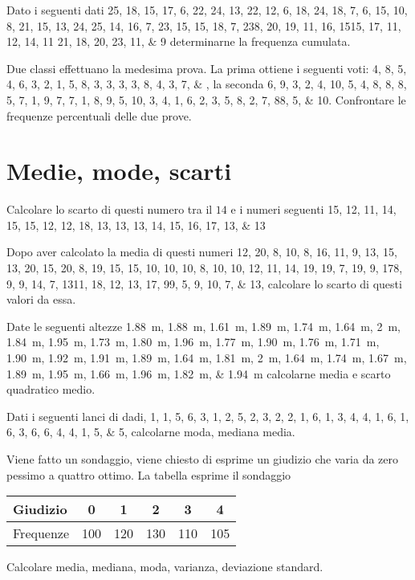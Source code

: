 \begin{esercizio}
Dato i seguenti dati \numlist{25; 18; 15; 17; 6; 22; 24; 13; 22; 12; 6; 18; 24; 18; 7; 6; 15; 10; 8; 21; 15; 13;
	24; 25; 14; 16; 7; 23; 15; 15; 18; 7; 23 8; 20; 19; 11; 16; 15 15; 17; 11; 12; 14; 11
	21; 18; 20; 23; 11; 9} determinarne la frequenza cumulata.
\end{esercizio}
\begin{esercizio}
	Due classi effettuano la medesima prova. La prima ottiene i seguenti voti: \numlist{4; 8; 5; 4; 6; 3; 2; 1; 5; 8; 3; 3; 3; 3; 8; 4; 3; 7;}, la seconda \numlist{6; 9; 3; 2; 4; 10; 5; 4; 8; 8; 8; 5; 7; 1; 9; 7; 7; 1; 8; 9; 5; 10; 3; 4; 1; 6; 2; 3; 5;
		8; 2; 7; 8 8; 5; 10}. Confrontare le frequenze percentuali delle due prove.
\end{esercizio} 
\section{Medie, mode, scarti}
\begin{esercizio}
	Calcolare lo scarto di questi numero tra il $14$ e i numeri seguenti \numlist{15; 12; 11; 14; 15; 15; 12; 12; 18; 13; 13; 13; 14; 15; 16; 17; 13; 13}
\end{esercizio}
\begin{esercizio}
	Dopo aver calcolato la media di questi numeri \numlist{12; 20; 8; 10; 8; 16; 11; 9; 13; 15; 13; 20; 15; 20; 8; 19; 15; 15; 10; 10; 10; 8;
		10; 10; 12; 11; 14; 19; 19; 7; 19; 9; 17 8; 9; 9; 14; 7; 13 11; 18; 12; 13; 17; 9 9; 5;
		9; 10; 7; 13}, calcolare lo scarto di questi valori da essa.
\end{esercizio}
\begin{esercizio}
	 Date le seguenti altezze \SIlist{1.88; 1.88; 1.61; 1.89; 1.74; 1.64; 2; 1.84; 1.95; 1.73; 1.80; 1.96; 1.77; 1.90; 1.76; 1.71; 1.90;
		1.92; 1.91; 1.89; 1.64; 1.81; 2; 1.64; 1.74; 1.67; 1.89; 1.95; 1.66; 1.96; 1.82; 1.94}{\m} calcolarne media e scarto quadratico medio.
\end{esercizio}
\begin{esercizio}
Dati i seguenti lanci di dadi, \numlist{1; 1; 5; 6; 3; 1; 2; 5; 2; 3; 2; 2; 1; 6; 1; 3; 4; 4; 1; 6; 1; 6; 3; 6; 6; 4; 4; 1; 5; 5}, calcolarne moda, mediana media.
\end{esercizio}
\begin{esercizio}
	
	\item Viene fatto un sondaggio, viene chiesto di esprime un giudizio che varia da zero pessimo a quattro  ottimo. La tabella esprime il sondaggio
	\begin{center}
		\begin{tabular}{l*{5} {S[table-format=3.0]}}
			{Giudizio}	&0  &1  &2  &3&4  \\
			\midrule 
			{Frequenze}	& 100 &120  & 130 & 110&105 \\ 
		\end{tabular}
	\end{center} Calcolare media, mediana, moda, varianza, deviazione standard.
\end{esercizio}

